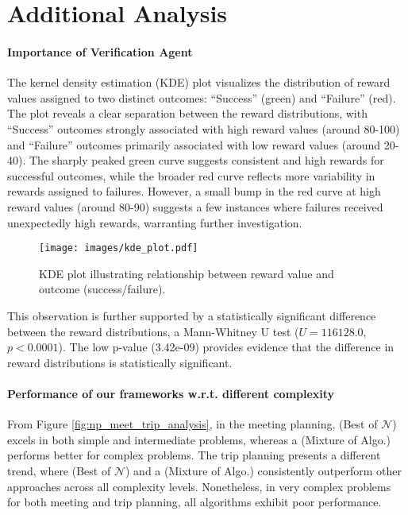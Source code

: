 \section{Additional Analysis}
\label{app:analysis}

\paragraph{Importance of Verification Agent}
The kernel density estimation (KDE) plot visualizes the distribution of reward values assigned to two distinct outcomes: ``Success'' (green) and ``Failure'' (red).  The plot reveals a clear separation between the reward distributions, with ``Success'' outcomes strongly associated with high reward values (around 80-100) and ``Failure'' outcomes primarily associated with low reward values (around 20-40). The sharply peaked green curve suggests consistent and high rewards for successful outcomes, while the broader red curve reflects more variability in rewards assigned to failures.  However, a small bump in the red curve at high reward values (around 80-90) suggests a few instances where failures received unexpectedly high rewards, warranting further investigation. 
\begin{wrapfigure}{r}{0.5\textwidth}
    \centering
    \vspace{2mm}
    \texttt{[image: images/kde\_plot.pdf]}
    \caption{KDE plot illustrating relationship between reward value and outcome (success/failure).}
    \label{fig:kde_plot}
\end{wrapfigure}This observation is further supported by a statistically significant difference between the reward distributions, a Mann-Whitney U test ($U = 116128.0$, $p < 0.0001$). The low p-value (3.42e-09) provides evidence that the difference in reward distributions is statistically significant.

\paragraph{Performance of our frameworks w.r.t. different complexity}

From Figure \ref{fig:np_meet_trip_analysis}, in the meeting planning, \plangen{} (Best of $\mathcal{N}$) excels in both simple and intermediate problems, whereas a \plangen{} (Mixture of Algo.) performs better for complex problems. The trip planning presents a different trend, where \plangen{} (Best of $\mathcal{N}$) and a \plangen{} (Mixture of Algo.) consistently outperform other approaches across all complexity levels. Nonetheless, in very complex problems for both meeting and trip planning, all algorithms exhibit poor performance.

